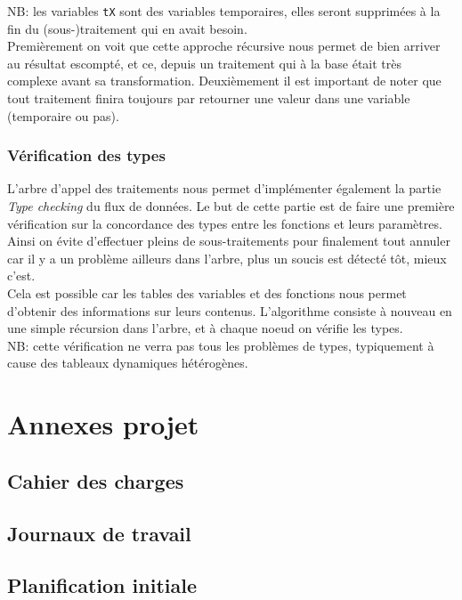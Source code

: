 \documentclass[french]{article}
\begin{document}
		NB: les variables \texttt{tX} sont des variables temporaires, elles seront supprimées à la fin du (sous-)traitement qui en avait besoin.\\
		
		Premièrement on voit que cette approche récursive nous permet de bien arriver au résultat escompté, et ce, depuis un traitement qui à la base était très complexe avant sa transformation. Deuxièmement il est important de noter que tout traitement finira toujours par retourner une valeur dans une variable (temporaire ou pas).
		
		\subsubsection{Vérification des types}
		\label{subsubsec:verification-des-types}
		L'arbre d'appel des traitements nous permet d'implémenter également la partie \textit{Type checking} du flux de données. Le but de cette partie est de faire une première vérification sur la concordance des types entre les fonctions et leurs paramètres. Ainsi on évite d'effectuer pleins de sous-traitements pour finalement tout annuler car il y a un problème ailleurs dans l'arbre, plus un soucis est détecté tôt, mieux c'est.\\
		
		Cela est possible car les tables des variables et des fonctions nous permet d'obtenir des informations sur leurs contenus. L'algorithme consiste à nouveau en une simple récursion dans l'arbre, et à chaque noeud on vérifie les types.\\
		
		NB: cette vérification ne verra pas tous les problèmes de types, typiquement à cause des tableaux dynamiques hétérogènes.	
		
	\section{Annexes projet}
		\subsection{Cahier des charges}
			
		\subsection{Journaux de travail}
			
		\subsection{Planification initiale}
				
				
				
				
				
				
\end{document}
